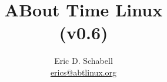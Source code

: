 \documentclass[a4paper]{article}
\begin{document}
\title{ABout Time Linux \\ (v0.6)}

\author{Eric D. Schabell \\ \url{erics@abtlinux.org}}

\maketitle




%



  
\end{document}
